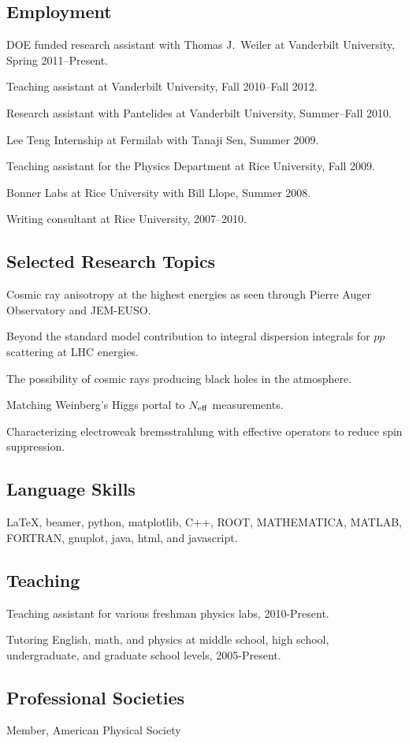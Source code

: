 \documentclass[letterpaper]{article}
\renewenvironment{itemize}{
\begin{list}{}{
\setlength{\leftmargin}{1.5em}
}
}{
\end{list}
}
\begin{document}
\subsection*{Employment}
\begin{itemize}
\item DOE funded research assistant with Thomas J.~Weiler at Vanderbilt University, Spring 2011--Present.
\item Teaching assistant at Vanderbilt University, Fall 2010--Fall 2012.
\item Research assistant with Pantelides at Vanderbilt University, Summer--Fall 2010.
\item Lee Teng Internship at Fermilab with Tanaji Sen, Summer 2009.
\item Teaching assistant for the Physics Department at Rice University, Fall 2009.
\item Bonner Labs at Rice University with Bill Llope, Summer 2008.
\item Writing consultant at Rice University, 2007--2010.
\end{itemize}
\subsection*{Selected Research Topics}
\begin{itemize}
\item Cosmic ray anisotropy at the highest energies as seen through Pierre Auger Observatory and JEM-EUSO.
\item Beyond the standard model contribution to integral dispersion integrals for $pp$ scattering at LHC energies.
\item The possibility of cosmic rays producing black holes in the atmosphere.
\item Matching Weinberg's Higgs portal to $N_{\rm{eff}}$ measurements.
\item Characterizing electroweak bremsstrahlung with effective operators to reduce spin suppression.
\end{itemize}
\subsection*{Language Skills}
\begin{itemize}
\item 
\LaTeX, beamer, python, matplotlib, C++, ROOT, MATHEMATICA, MATLAB, FORTRAN, gnuplot, java, html, and javascript.
\end{itemize}
\subsection*{Teaching}
\begin{itemize}
\item Teaching assistant for various freshman physics labs, 2010-Present.
\item Tutoring English, math, and physics at middle school, high school, undergraduate, and graduate school levels, 2005-Present.
\end{itemize}
\subsection*{Professional Societies}
\begin{itemize}
\item Member, American Physical Society
\end{itemize}
\end{document}

